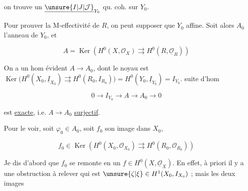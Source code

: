 
on trouve un $\underline{\unsure{I|J|\mathcal J}}_{Y_0}$ qu. coh. sur $Y_0$.

Pour prouver la M-effectivité de $R$, on peut supposer que $Y_0$  affine. Soit alors $A_0$ l'anneau de $Y_0$, et  

\[
A=\operatorname{Ker}\left(H^0(X,\mathcal O_X)\rightrightarrows H^0(R,\underline{\mathcal O}_R)\right)
\]

On a un hom évident $A\longrightarrow A_0$, dont le noyau est $\operatorname{Ker}\bigl(H^0(X_0,\underline I_{X_0})\rightrightarrows H^0(R_0,I_{R_0})\bigr)=H^0(Y_0,\underline I_{Y_0})=I_{Y_0}$.    suite d'hom

\[
0\longrightarrow I_{Y_0}\longrightarrow A\longrightarrow A_0\longrightarrow0
\]

est \uline{exacte}, i.e. $A\longrightarrow A_0$ \uline{surjectif}.

Pour le voir,  soit $\varphi_0\in A_0$, soit $f_0$ son image  dans $X_0$,  

\[
f_0\in\operatorname{Ker}\left(H^0(X_0,\mathcal O_{X_0})\rightrightarrows H^0(R_0,\mathcal O_{R_0})\right)
\]

Je dis d'abord que $f_0$ se remonte en un $f\in H^0(X,\underline{\mathcal O}_X)$. En effet, à priori il y a une obstruction à relever qui est  $\unsure{\zeta|\xi}\in H^1(X_0,I_{X_0})$ ; mais les deux images
